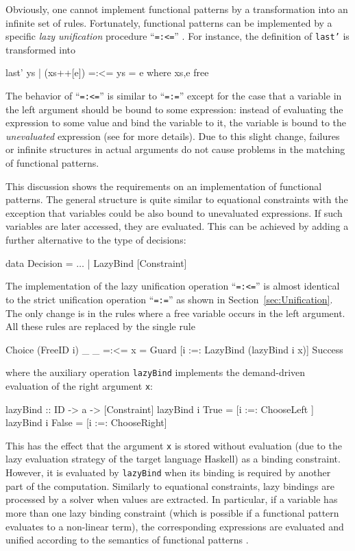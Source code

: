 \documentclass{llncs}
\newcommand{\code}[1]{\mbox{\small\texttt{#1}}}
\newcommand{\ccode}[1]{``\code{#1}''}
\begin{document}
Obviously, one cannot implement functional patterns by
a transformation into an infinite set of rules.
Fortunately, functional patterns can be implemented by
a specific \emph{lazy unification} procedure \ccode{=:<=}
\cite{AntoyHanus05LOPSTR}.
For instance, the definition of \code{last'} is transformed into
\begin{curry}
  last' ys | (xs++[e]) =:<= ys  = e   where xs,e free
\end{curry}
The behavior of \ccode{=:<=} is similar to \ccode{=:=}
except for the case that a variable in the left argument
should be bound to some expression: instead of evaluating
the expression to some value and bind the variable to it,
the variable is bound to the \emph{unevaluated} expression
(see \cite{AntoyHanus05LOPSTR} for more details).
Due to this slight change, failures or infinite structures
in actual arguments do not cause problems in the matching
of functional patterns.

This discussion shows the requirements on an implementation
of functional patterns. The general structure
is quite similar to equational constraints
with the exception that variables could be also bound
to unevaluated expressions. If such variables are later
accessed, they are evaluated.
This can be achieved by adding a further alternative
to the type of decisions:
\begin{haskell}
  data Decision = $\ldots$ | LazyBind [Constraint]
\end{haskell}
%
The implementation of the lazy unification operation \ccode{=:<=}
is almost identical to the strict unification operation \ccode{=:=}
as shown in Section~\ref{sec:Unification}.
The only change is in the rules where a free variable occurs
in the left argument. All these rules are replaced by the single
rule
\begin{haskell}
  Choice (FreeID i) _ _ =:<= x
    = Guard [i :=: LazyBind (lazyBind i x)] Success
\end{haskell}
where the auxiliary operation \code{lazyBind}
implements the demand-driven evaluation of the right argument \code{x}:
\begin{haskell}
  lazyBind :: ID -> a -> [Constraint]
  lazyBind i True  = [i :=: ChooseLeft ]
  lazyBind i False = [i :=: ChooseRight]
\end{haskell}
This has the effect that the argument \code{x} is stored
without evaluation (due to the lazy evaluation strategy of the
target language Haskell) as a binding constraint.
However, it is evaluated by \code{lazyBind} when its binding
is required by another part of the computation.
Similarly to equational constraints,
lazy bindings are processed by a solver when values are extracted.
In particular, if a variable has more than one lazy binding constraint
(which is possible if a functional pattern evaluates to a non-linear term),
the corresponding expressions are evaluated and unified
according to the semantics of functional patterns
\cite{AntoyHanus05LOPSTR}.
\end{document}
